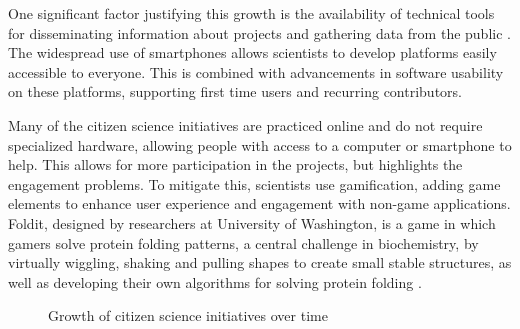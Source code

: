 One significant factor justifying this growth is the availability of technical tools for disseminating information about projects and gathering data from the public \cite{silvertown2009new}. The widespread use of smartphones allows scientists to develop platforms easily accessible to everyone. This is combined with advancements in software usability on these platforms, supporting first time users and recurring contributors.

Many of the citizen science initiatives are practiced online and do not require specialized hardware, allowing people with access to a computer or smartphone to help. This allows for more participation in the projects, but highlights the engagement problems. To mitigate this, scientists use gamification, adding game elements to enhance user experience and engagement with non-game applications. Foldit, designed by researchers at University of Washington, is a game in which gamers solve protein folding patterns, a central challenge in biochemistry, by virtually wiggling, shaking and pulling shapes to create small stable structures, as well as developing their own algorithms for solving protein folding \cite{bourzac2008enlisting}.

\publicationdata

\begin{figure}[!h]
    \centering
    \caption{Growth of citizen science initiatives over time}
    \label{fig:growth-citizen-science-projects}
\end{figure}

